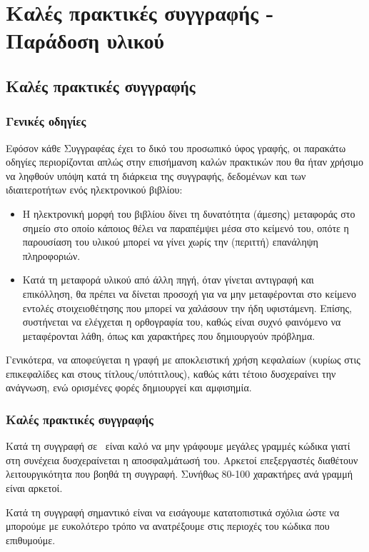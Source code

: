 \chapter{Καλές πρακτικές συγγραφής - Παράδοση υλικού}\label{chap:best-practice}

\section{Καλές πρακτικές συγγραφής}
\subsection{Γενικές οδηγίες}
Εφόσον κάθε Συγγραφέας έχει το δικό του προσωπικό ύφος γραφής, οι παρακάτω οδηγίες
περιορίζονται απλώς στην επισήμανση καλών πρακτικών που θα ήταν χρήσιμο να
ληφθούν υπόψη κατά τη διάρκεια της συγγραφής, δεδομένων και των ιδιαιτεροτήτων ενός
ηλεκτρονικού βιβλίου:
\begin{itemize}
\item Η ηλεκτρονική μορφή του βιβλίου δίνει τη δυνατότητα (άμεσης) μεταφοράς στο
σημείο στο οποίο κάποιος θέλει να παραπέμψει μέσα στο κείμενό του, οπότε η
παρουσίαση του υλικού μπορεί να γίνει χωρίς την (περιττή) επανάληψη
πληροφοριών.
\item Κατά τη μεταφορά υλικού από άλλη πηγή, όταν γίνεται αντιγραφή και
επικόλληση, θα πρέπει να δίνεται προσοχή για να μην
μεταφέρονται στο κείμενο εντολές στοιχειοθέτησης που μπορεί να χαλάσουν την
ήδη υφιστάμενη. Επίσης, συστήνεται να ελέγχεται η ορθογραφία του, καθώς είναι
συχνό φαινόμενο να μεταφέρονται λάθη, όπως και χαρακτήρες που δημιουργούν
πρόβλημα.
\end{itemize}
Γενικότερα, να αποφεύγεται η γραφή με αποκλειστική χρήση κεφαλαίων (κυρίως στις
επικεφαλίδες και στους τίτλους/υπότιτλους), καθώς κάτι τέτοιο δυσχεραίνει την
ανάγνωση, ενώ ορισμένες φορές δημιουργεί και αμφισημία.
\subsection{Καλές πρακτικές συγγραφής \XeLaTeX}
Κατά τη συγγραφή σε \XeLaTeX\ είναι καλό να μην γράφουμε μεγάλες γραμμές κώδικα γιατί στη
συνέχεια δυσχεραίνεται η αποσφαλμάτωσή του. Αρκετοί επεξεργαστές διαθέτουν λειτουργικότητα
που βοηθά τη συγγραφή. Συνήθως 80-100 χαρακτήρες ανά γραμμή είναι αρκετοί.

Κατά τη συγγραφή σημαντικό είναι να εισάγουμε κατατοπιστικά σχόλια ώστε να μπορούμε
με ευκολότερο τρόπο να ανατρέξουμε στις περιοχές του κώδικα που επιθυμούμε.


